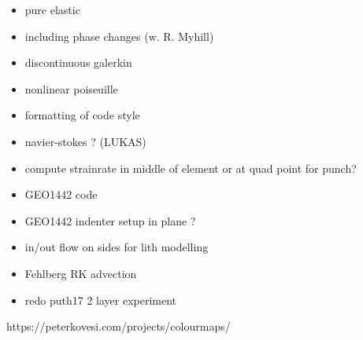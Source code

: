 \documentclass[a4paper]{article}
\begin{document}
\begin{itemize}
\item
pure elastic 

\item
including phase changes (w. R. Myhill)

\item
discontinuous galerkin

\item
nonlinear poiseuille

\item
formatting of code style

\item
navier-stokes ? (LUKAS)

\item
compute strainrate in middle of element or at quad point for punch?

\item
GEO1442 code 

\item
GEO1442 indenter setup in plane ?

\item
in/out flow on sides for lith modelling

\item
Fehlberg RK advection

\item redo puth17 2 layer experiment

\end{itemize}


https://peterkovesi.com/projects/colourmaps/
\end{document}
